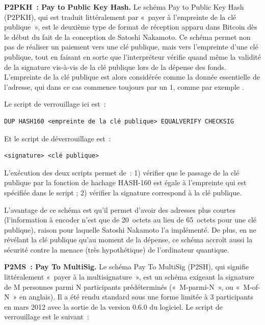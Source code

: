 
\textbf{P2PKH~: Pay to Public Key Hash.} Le schéma Pay to Public Key Hash (P2PKH), qui est traduit littéralement par «~payer à l'empreinte de la clé publique~», est le deuxième type de format de réception apparu dans Bitcoin dès le début du fait de la conception de Satoshi Nakamoto. Ce schéma permet non pas de réaliser un paiement vers une clé publique, mais vers l'empreinte d'une clé publique, tout en faisant en sorte que l'interpréteur vérifie quand même la validité de la signature vis-à-vis de la clé publique lors de la dépense des fonds. L'empreinte de la clé publique est alors considérée comme la donnée essentielle de l'adresse, qui dans ce cas commence toujours par un 1, comme par exemple .

Le script de verrouillage ici est~:

\begin{Verbatim}[fontsize=\small]
DUP HASH160 <empreinte de la clé publique> EQUALVERIFY CHECKSIG
\end{Verbatim}

Et le script de déverrouillage est~:

\begin{Verbatim}[fontsize=\small]
<signature> <clé publique>
\end{Verbatim}

L'exécution des deux scripts permet de~: 1) vérifier que le passage de la clé publique par la fonction de hachage HASH-160 est égale à l'empreinte qui est spécifiée dans le script ; 2) vérifier la signature correspond à la clé publique.

L'avantage de ce schéma est qu'il permet d'avoir des adresses plus courtes (l'information à encoder n'est que de 20~octets au lieu de 65~octets pour une clé publique), raison pour laquelle Satoshi Nakamoto l'a implémenté. De plus, en ne révélant la clé publique qu'au moment de la dépense, ce schéma accroît aussi la sécurité contre la menace (très hypothétique) de l'ordinateur quantique.


\textbf{P2MS~: Pay To MultiSig.} Le schéma Pay To MultiSig (P2SH), qui signifie littéralement «~payer à la multisignature~», est un schéma exigeant la signature de M personnes parmi N participants prédéterminés («~M-parmi-N~», ou «~M-of-N~» en anglais). Il a été rendu standard sous une forme limitée à 3 participants en mars 2012 avec la sortie de la version 0.6.0 du logiciel. Le script de verrouillage est le suivant~:

